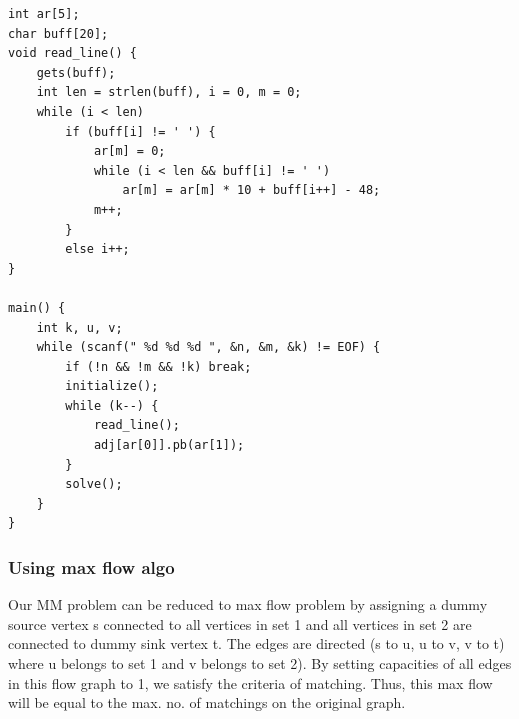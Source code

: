 \documentclass[8pt, a4paper, oneside, twocolumn]{extarticle}
\begin{document}
\begin{enumerate}
\begin{verbatim}
int ar[5];
char buff[20];
void read_line() {
    gets(buff);
    int len = strlen(buff), i = 0, m = 0;
    while (i < len)
        if (buff[i] != ' ') {
            ar[m] = 0;
            while (i < len && buff[i] != ' ')
                ar[m] = ar[m] * 10 + buff[i++] - 48;
            m++;
        }
        else i++;
}

main() {
    int k, u, v;
    while (scanf(" %d %d %d ", &n, &m, &k) != EOF) {
        if (!n && !m && !k) break;
        initialize();
        while (k--) {
            read_line();
            adj[ar[0]].pb(ar[1]);
        }
        solve();
    }
}
    \end{verbatim}
\end{enumerate}
\subsubsection{Using max flow algo}
Our MM problem can be reduced to max flow problem by assigning a dummy source vertex s connected to all vertices in set 1 and all vertices in set 2 are connected to dummy sink vertex t. The edges are directed (s to u, u to v, v to t) where u belongs to set 1 and v belongs to set 2). By setting capacities of all edges in this flow graph to 1, we satisfy the criteria of matching. Thus, this max flow will be equal to the max. no. of matchings on the original graph.
\end{document}
